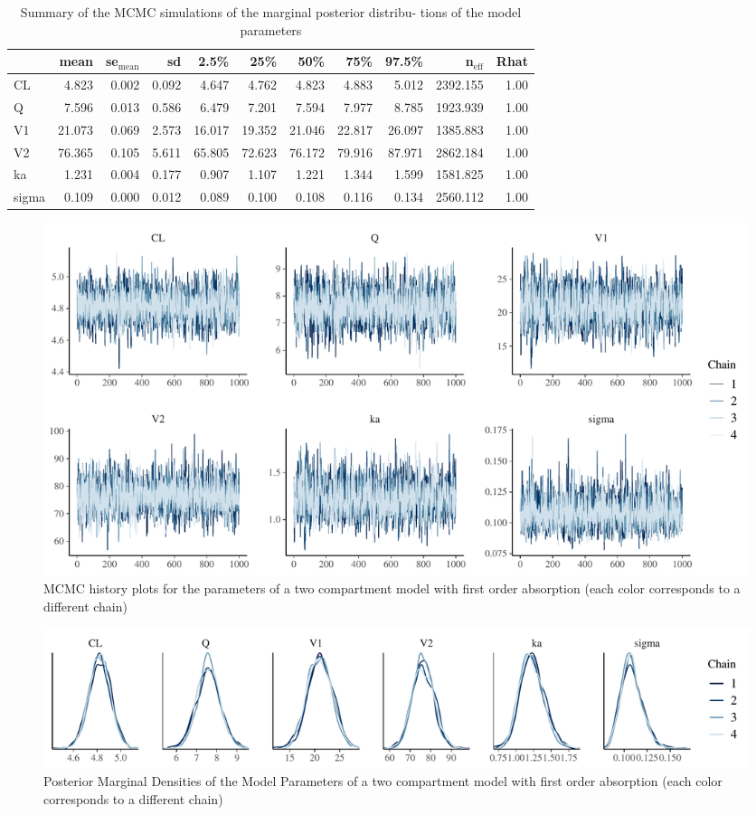 \documentclass[10pt, reqno, oneside]{amsbook}
\numberwithin{equation}{chapter}
\numberwithin{figure}{chapter}
\numberwithin{table}{chapter}
\theoremstyle{remark}
\begin{document}
\begin{table}[htbp]
\centering
\begin{tabular}{lrrrrrrrrrr}
\hline
 & mean & se\(_{\text{mean}}\) & sd & 2.5\% & 25\% & 50\% & 75\% & 97.5\% & n\(_{\text{eff}}\) & Rhat\\
\hline
CL & 4.823 & 0.002 & 0.092 & 4.647 & 4.762 & 4.823 & 4.883 & 5.012 & 2392.155 & 1.00\\
Q & 7.596 & 0.013 & 0.586 & 6.479 & 7.201 & 7.594 & 7.977 & 8.785 & 1923.939 & 1.00\\
V1 & 21.073 & 0.069 & 2.573 & 16.017 & 19.352 & 21.046 & 22.817 & 26.097 & 1385.883 & 1.00\\
V2 & 76.365 & 0.105 & 5.611 & 65.805 & 72.623 & 76.172 & 79.916 & 87.971 & 2862.184 & 1.00\\
ka & 1.231 & 0.004 & 0.177 & 0.907 & 1.107 & 1.221 & 1.344 & 1.599 & 1581.825 & 1.00\\
sigma & 0.109 & 0.000 & 0.012 & 0.089 & 0.100 & 0.108 & 0.116 & 0.134 & 2560.112 & 1.00\\
\hline
\end{tabular}
\caption{\label{tab:twocpt_summary}
Summary of the MCMC simulations of the marginal posterior distribu- tions of the model parameters}

\end{table}

\begin{figure}[htbp]
\centering
\includegraphics[width=0.8\linewidth]{../example-models/pk2cpt/deliv/figure/history.pdf}
\caption{\label{twocpt_mcmc_history}
MCMC history plots for the parameters of a two compartment model with first order absorption (each color corresponds to a different chain)}
\end{figure}

\begin{figure}[htbp]
\centering
\includegraphics[width=0.8\linewidth]{../example-models/pk2cpt/deliv/figure/density.pdf}
\caption{\label{twocpt_mcmc_posterior}
Posterior Marginal Densities of the Model Parameters of a two compartment model with first order absorption (each color corresponds to a different chain)}
\end{figure}
\end{document}
